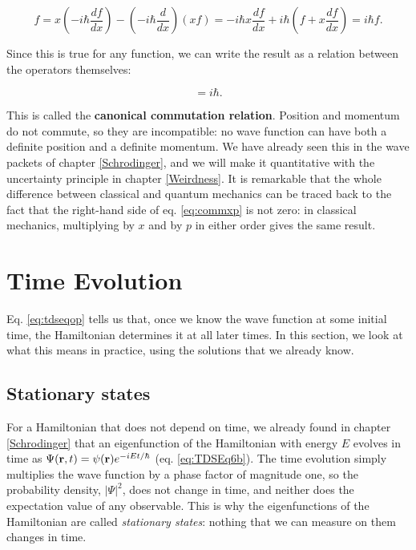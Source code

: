 \documentclass[
  english,
  9pt,
]{extbook}
\theoremstyle{definition}
\theoremstyle{definition}
\theoremstyle{definition}
\theoremstyle{definition}
\theoremstyle{remark}
\begin{document}
\begin{equation}
[\hat{x},\hat{p}]f = x\left(-i\hbar\frac{df}{dx}\right) - \left(-i\hbar\frac{d}{dx}\right)(xf) = -i\hbar x\frac{df}{dx} + i\hbar\left(f + x\frac{df}{dx}\right) = i\hbar f.
\label{eq:commxp1}
\end{equation}

Since this is true for any function, we can write the result as a relation between the operators themselves:

\begin{equation}
[\hat{x},\hat{p}] = i\hbar.
\label{eq:commxp}
\end{equation}

This is called the \textbf{canonical commutation relation}. Position and momentum do not commute, so they are incompatible: no wave function can have both a definite position and a definite momentum. We have already seen this in the wave packets of chapter \ref{Schrodinger}, and we will make it quantitative with the uncertainty principle in chapter \ref{Weirdness}. It is remarkable that the whole difference between classical and quantum mechanics can be traced back to the fact that the right-hand side of eq. \eqref{eq:commxp} is not zero: in classical mechanics, multiplying by \(x\) and by \(p\) in either order gives the same result.

\section{Time Evolution}\label{TimeEvolution}

Eq. \eqref{eq:tdseqop} tells us that, once we know the wave function at some initial time, the Hamiltonian determines it at all later times. In this section, we look at what this means in practice, using the solutions that we already know.

\subsection{Stationary states}\label{stationary-states}

For a Hamiltonian that does not depend on time, we already found in chapter \ref{Schrodinger} that an eigenfunction of the Hamiltonian with energy \(E\) evolves in time as \(\Psi({\bf r}, t) = \psi({\bf r})e^{-iEt/\hbar}\) (eq. \eqref{eq:TDSEq6b}). The time evolution simply multiplies the wave function by a phase factor of magnitude one, so the probability density, \(|\Psi|^2\), does not change in time, and neither does the expectation value of any observable. This is why the eigenfunctions of the Hamiltonian are called \emph{stationary states}: nothing that we can measure on them changes in time.
\end{document}
